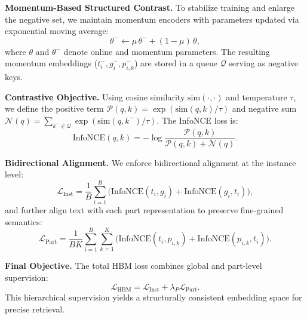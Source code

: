 \documentclass[10pt,journal,compsoc]{IEEEtran}
\newcommand{\myparagraph}[1]{\textbf{#1}\hspace{1.8ex}}
\begin{document}
\noindent \myparagraph{Momentum-Based Structured Contrast.}
To stabilize training and enlarge the negative set, we maintain momentum encoders with parameters updated via exponential moving average:
\begin{equation}
\theta^{-} \leftarrow \mu\, \theta^{-} + (1 - \mu)\, \theta,
\end{equation}
where $\theta$ and $\theta^{-}$ denote online and momentum parameters. The resulting momentum embeddings ($t_i^{-}, g_i^{-}, p_{i,k}^{-}$) are stored in a queue $\mathcal{Q}$ serving as negative keys.

\noindent \myparagraph{Contrastive Objective.}
Using cosine similarity $\mathrm{sim}(\cdot,\cdot)$ and temperature $\tau$, we define the positive term $\mathcal{P}(q,k) = \exp(\mathrm{sim}(q,k)/\tau)$ and negative sum $\mathcal{N}(q) = \sum_{k^- \in \mathcal{Q}} \exp(\mathrm{sim}(q,k^-)/\tau)$. The InfoNCE loss is:
\begin{equation}
\mathrm{InfoNCE}(q,k)
=
-\log
\frac{
    \mathcal{P}(q,k)
}{
    \mathcal{P}(q,k) + \mathcal{N}(q)
}.
\end{equation}

\noindent \myparagraph{Bidirectional Alignment.}
We enforce bidirectional alignment at the instance level:
\begin{equation}
\mathcal{L}_{\mathrm{Inst}}
=
\frac{1}{B}
\sum_{i=1}^{B}
\Big(
\mathrm{InfoNCE}(t_i, g_i)
+
\mathrm{InfoNCE}(g_i, t_i)
\Big),
\end{equation}
and further align text with each part representation to preserve fine-grained semantics:
\begin{equation}
\mathcal{L}_{\mathrm{Part}}
=
\frac{1}{BK}
\sum_{i=1}^{B}
\sum_{k=1}^{K}
\Big(
\mathrm{InfoNCE}(t_i, p_{i,k})
+
\mathrm{InfoNCE}(p_{i,k}, t_i)
\Big).
\end{equation}

\noindent \myparagraph{Final Objective.}
The total HBM loss combines global and part-level supervision:
\begin{equation}
\mathcal{L}_{\mathrm{HBM}}
=
\mathcal{L}_{\mathrm{Inst}}
+
\lambda_P \mathcal{L}_{\mathrm{Part}}.
\end{equation}
This hierarchical supervision yields a structurally consistent embedding space for precise retrieval.

\end{document}

